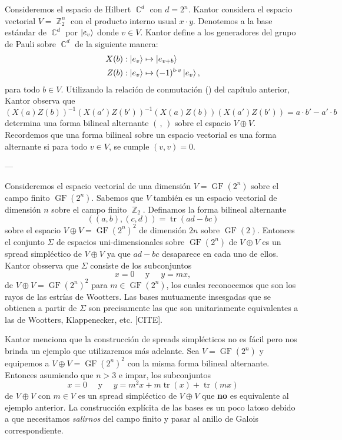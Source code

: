 \documentclass[a4paper]{report}
\DeclareMathOperator{\C}{\mathbb{C}}
\DeclareMathOperator{\Z}{\mathbb{Z}}
\DeclareMathOperator{\tr}{tr}
\DeclareMathOperator{\GF}{GF}
\begin{document}
  Consideremos el espacio de Hilbert $\C^{d}$ con $d =
  2^{n}$. Kantor considera el espacio vectorial $V =
  \Z_2^{n}$ con el producto interno usual $x \cdot y$.
  Denotemos a la base estándar de $\C^{d}$ por $\ket{e_v}$ 
  donde $v \in V$. Kantor define a los generadores del grupo
  de Pauli sobre $\C^{d}$ de la siguiente manera:
  \begin{align}
    X(b) &: \ket{e_v} \mapsto \ket{e_{v+b}} \\
    Z(b) &: \ket{e_v} \mapsto (-1)^{b \cdot v} \ket{e_v},
  \end{align}
  para todo $b \in V$. Utilizando la relación de conmutación
  () del capítulo anterior, Kantor observa que
  \begin{equation}
    (X(a)Z(b))^{-1}(X(a')Z(b'))^{-1} (X(a)Z(b))(X(a')Z(b'))
    = a \cdot b' - a' \cdot b
  \end{equation}
  determina una forma bilineal alternante $(\,,\,)$ sobre el
  espacio $V \oplus V$. Recordemos que una forma bilineal
  sobre un espacio vectorial es una forma alternante si para
  todo $v \in V$, se cumple $(v,v) = 0$.
  
  ---

  Consideremos el espacio vectorial de una dimensión $V =
  \GF(2^{n})$ sobre el campo finito $\GF(2^{n})$. Sabemos
  que $V$ también es un espacio vectorial de dimensión $n$ 
  sobre el campo finito $\Z_2$. Definamos la forma bilineal
  alternante
  \[
    \left( (a,b), (c,d) \right) 
    = \tr(ad-bc)
  \] 
  sobre el espacio $V \oplus V = \GF(2^{n})^2$ de dimensión
  $2n$ sobre $\GF(2)$. Entonces el conjunto $\Sigma$ de
  espacios uni-dimensionales sobre $\GF(2^{n})$ de $V \oplus
  V$ es un spread simpléctico de $V \oplus V$ ya que $ad-bc$
  desaparece en cada uno de ellos. Kantor obsserva que
  $\Sigma$ consiste de los subconjuntos
  \[
    x = 0
    \quad \text{ y } \quad
    y = mx,
  \]
  de $V \oplus V = \GF(2^{n})^2$ para $m \in \GF(2^{n})$,
  los cuales reconocemos que son los rayos de las estrías de
  Wootters. Las bases mutuamente insesgadas que se obtienen
  a partir de $\Sigma$ son precisamente las que son
  unitariamente equivalentes a las de Wootters,
  Klappenecker, etc. [CITE]. 

  Kantor menciona que la construcción de spreads
  simplécticos no es fácil pero nos brinda un ejemplo que
  utilizaremos más adelante. Sea $V = \GF(2^{n})$ y
  equipemos a $V \oplus V = \GF(2^{n})^2$ con la misma forma
  bilineal alternante. Entonces asumiendo que $n > 3$ e
  impar, los subconjuntos 
  \begin{equation}
    \label{eqn:qubit_alt_spread}
    x = 0
    \quad \text{ y } \quad
    y = m^2x + m\tr(x) + \tr(mx)
  \end{equation}
  de $V \oplus V$ con $m \in V$ es un spread simpléctico de
  $V \oplus V$ que \textbf{no} es equivalente al ejemplo
  anterior. La construcción explícita de las bases es un
  poco latoso debido a que necesitamos \textit{salirnos} del
  campo finito y pasar al anillo de Galois correspondiente.
\end{document}
